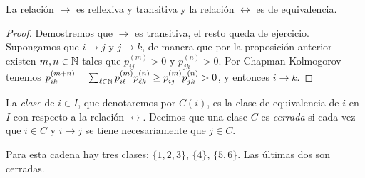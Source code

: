 \begin{prop}
La relación $\to$ es reflexiva y transitiva y la relación $\leftrightarrow$ es de equivalencia.
\end{prop}

\begin{proof}
Demostremos que $\to$ es transitiva, el resto queda de ejercicio.
Supongamos que $i\to j$ y $j\to k$, de manera que por la proposición anterior existen $m,n\in\mathbb{N}$ tales que $p^{(m)}_{ij}>0$ y $p^{(n)}_{jk}>0$.
Por Chapman-Kolmogorov tenemos $p^{(m+n)}_{ik}=\sum_{\ell\in\mathbb{N}}p^{(m)}_{i\ell}p^{(n)}_{\ell k}\geq p^{(m)}_{ij}p^{(n)}_{jk}>0$, y entonces $i\to k$.
\end{proof}

\begin{defn}
La \emph{clase} de $i\in I$, que denotaremos por $C(i)$, es la clase de equivalencia de $i$ en $I$ con respecto a la relación $\leftrightarrow$.
Decimos que una clase $C$ es \emph{cerrada} si cada vez que $i\in C$ y $i\to j$ se tiene necesariamente que $j\in C$.
\end{defn}

\begin{ex}
\leavevmode
\begin{center}
\end{center}
Para esta cadena hay tres clases: $\{1,2,3\}$, $\{4\}$, $\{5,6\}$.
Las últimas dos son cerradas.
\end{ex}


